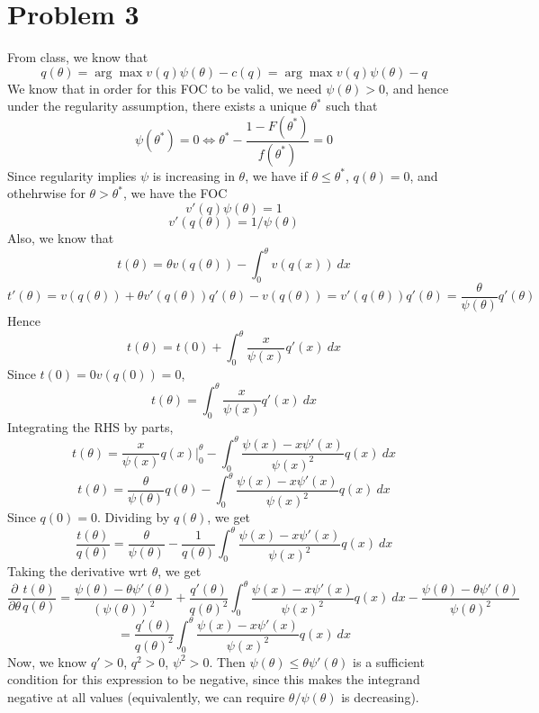 \documentclass[10pt,letter]{article}
\begin{document}
\section*{Problem 3}
From class, we know that
\[ q(\theta) = \arg\max v(q) \psi(\theta) - c(q)  = \arg\max v(q) \psi(\theta) - q \]
We know that in order for this FOC to be valid, we need $\psi(\theta) > 0$, and hence under the regularity assumption, there exists a unique $\theta^*$ such that
\[ \psi(\theta^*) = 0 \iff \theta^* - \frac{1-F(\theta^*)}{f(\theta^*)} = 0\]
Since regularity implies $\psi$ is increasing in $\theta$, we have if $\theta \le \theta^*$, $q(\theta) = 0$, and othehrwise for $\theta > \theta^*$, we have the FOC
\[ v'(q) \psi(\theta) = 1 \]
\[ v'(q(\theta)) = 1/\psi(\theta) \]
Also, we know that
\[ t(\theta)= \theta v(q(\theta)) - \int_{0}^\theta v(q(x)) \ dx \]
\[ t'(\theta) = v(q(\theta)) + \theta v'(q(\theta))q'(\theta) - v(q(\theta)) = v'(q(\theta))q'(\theta) = \frac{\theta }{\psi(\theta)}q'(\theta) \]
Hence
\[ t(\theta) = t(0) + \int_0^{\theta} \frac{x}{\psi(x)}q'(x) \ dx \]
Since $t(0) = 0 v(q(0)) = 0$,
\[ t(\theta) = \int_0^{\theta} \frac{x}{\psi(x)}q'(x) \ dx \]
Integrating the RHS by parts,
\[ t(\theta) = \frac{x}{\psi(x)}q(x) \Bigr|_0^\theta - \int_0^\theta \frac{\psi(x) - x \psi'(x)}{\psi(x)^2 }q(x) \ dx \]
\[ t(\theta) = \frac{\theta}{\psi(\theta)}q(\theta) - \int_0^\theta \frac{\psi(x) - x \psi'(x)}{\psi(x)^2 }q(x) \ dx \]
Since $q(0) = 0$. Dividing by $q(\theta)$, we get
\[ \frac{t(\theta)}{q(\theta)} = \frac{\theta}{\psi(\theta)} - \frac{1}{q(\theta)}\int_0^\theta \frac{\psi(x) - x \psi'(x)}{\psi(x)^2 }q(x) \ dx \]
Taking the derivative wrt $\theta$, we get
\[ \frac{\partial}{\partial \theta}\frac{t(\theta)}{q(\theta)} = \frac{\psi(\theta) - \theta \psi'(\theta)}{(\psi(\theta))^2} + \frac{q'(\theta)}{q(\theta)^2}\int_0^\theta \frac{\psi(x) - x\psi'(x)}{\psi(x)^2 }q(x) \ dx - \frac{\psi(\theta) - \theta \psi'(\theta)}{\psi(\theta)^2 } \]
\[ = \frac{q'(\theta)}{q(\theta)^2}\int_0^\theta \frac{\psi(x) - x\psi'(x)}{\psi(x)^2 }q(x) \ dx \]
Now, we know $q' > 0$, $q^2 > 0$, $\psi^2 > 0$. Then $\psi(\theta) \le \theta \psi'(\theta) $ is a sufficient condition for this expression to be negative, since this makes the integrand negative at all values (equivalently, we can require $\theta / \psi(\theta)$ is decreasing).
\end{document}
